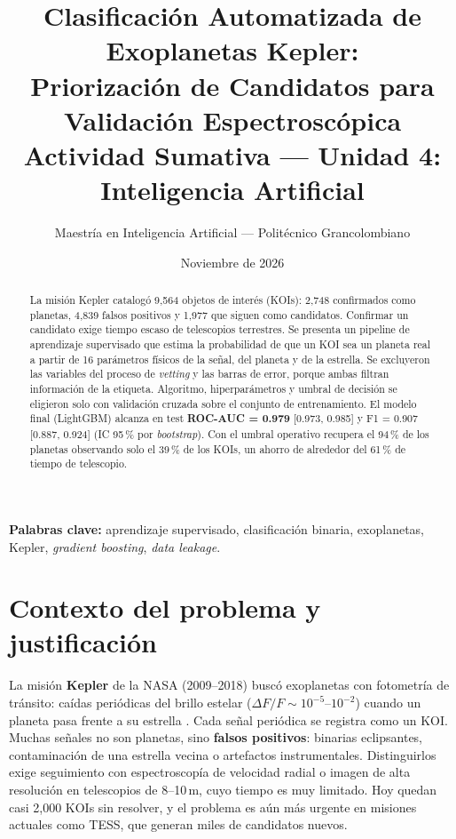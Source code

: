 \documentclass[11pt,a4paper]{article}
\title{\vspace{-1.2cm}\textbf{Clasificación Automatizada de Exoplanetas Kepler:\\Priorización de Candidatos para Validación Espectroscópica}\\[2pt]
\large Actividad Sumativa — Unidad 4: Inteligencia Artificial}
\author{Maestría en Inteligencia Artificial — Politécnico Grancolombiano}
\date{Noviembre de 2026}
\begin{document}
\maketitle
\vspace{-0.6cm}

\begin{abstract}
\noindent La misión Kepler catalogó 9,564 objetos de interés (KOIs): 2,748 confirmados como planetas, 4,839 falsos positivos y 1,977 que siguen como candidatos. Confirmar un candidato exige tiempo escaso de telescopios terrestres. Se presenta un pipeline de aprendizaje supervisado que estima la probabilidad de que un KOI sea un planeta real a partir de 16 parámetros físicos de la señal, del planeta y de la estrella. Se excluyeron las variables del proceso de \textit{vetting} y las barras de error, porque ambas filtran información de la etiqueta. Algoritmo, hiperparámetros y umbral de decisión se eligieron solo con validación cruzada sobre el conjunto de entrenamiento. El modelo final (LightGBM) alcanza en test \textbf{ROC-AUC = 0.979} [0.973, 0.985] y F1 = 0.907 [0.887, 0.924] (IC 95\,\% por \textit{bootstrap}). Con el umbral operativo recupera el 94\,\% de los planetas observando solo el 39\,\% de los KOIs, un ahorro de alrededor del 61\,\% de tiempo de telescopio.
\end{abstract}

\noindent\textbf{Palabras clave:} aprendizaje supervisado, clasificación binaria, exoplanetas, Kepler, \textit{gradient boosting}, \textit{data leakage}.

\section{Contexto del problema y justificación}
La misión \textbf{Kepler} de la NASA (2009--2018) buscó exoplanetas con fotometría de tránsito: caídas periódicas del brillo estelar ($\Delta F/F\sim10^{-5}$--$10^{-2}$) cuando un planeta pasa frente a su estrella \cite{borucki2010}. Cada señal periódica se registra como un KOI. Muchas señales no son planetas, sino \textbf{falsos positivos}: binarias eclipsantes, contaminación de una estrella vecina o artefactos instrumentales. Distinguirlos exige seguimiento con espectroscopía de velocidad radial o imagen de alta resolución en telescopios de 8--10\,m, cuyo tiempo es muy limitado. Hoy quedan casi 2,000 KOIs sin resolver, y el problema es aún más urgente en misiones actuales como TESS, que generan miles de candidatos nuevos.
\end{document}

